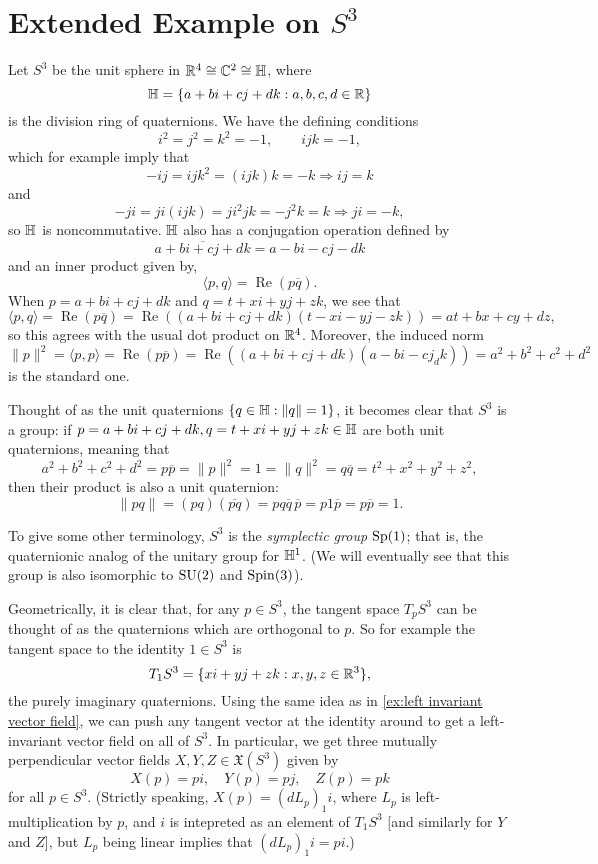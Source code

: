 
\section{Extended Example on $S^3$}
\label{sec:S^3 example}

Let $S^3$ be the unit sphere in $\mathbb{R}^4 \cong \mathbb{C}^2 \cong \mathbb{H}$, where 
\[
	\mathbb{H} = \{ a + bi + cj + dk : a,b,c,d\in \mathbb{R}\}
\]
is the division ring of quaternions. We have the defining conditions
\[
	i^2=j^2=k^2 = -1, \qquad ijk = -1,
\]
which for example imply that 
\[
	-ij = ijk^2 = (ijk)k = -k \Rightarrow ij=k
\]
and
\[
	-ji = ji(ijk) = ji^2jk = -j^2k = k \Rightarrow ji = -k,
\]
so $\mathbb{H}$ is noncommutative. $\mathbb{H}$ also has a conjugation operation defined by 
\[
	\overline{a+bi+cj+dk} = a-bi-cj-dk
\]
and an inner product given by,
\[
	\langle p,q \rangle = \operatorname{Re}(p\overline{q}).
\]
When $p = a+bi+cj+dk$ and $q = t + xi + yj + zk$, we see that
\[
	\langle p , q \rangle = \operatorname{Re}(p\overline{q}) = \operatorname{Re}((a+bi+cj+dk)(t-xi-yj-zk)) = at+bx+cy+dz,
\]
so this agrees with the usual dot product on $\mathbb{R}^4$. Moreover, the induced norm
\[
	\|p\|^2 = \langle p, p\rangle = \operatorname{Re}(p \overline{p}) = \operatorname{Re}((a+bi+cj+dk) (a-bi-cj_dk)) = a^2 + b^2 + c^2 + d^2
\]
is the standard one.

Thought of as the unit quaternions $\{q \in \mathbb{H} : \|q\| = 1\}$, it becomes clear that $S^3$ is a group: if $p = a+bi+cj+dk , q = t + xi + yj + zk \in \mathbb{H}$ are both unit quaternions, meaning that
\[
	a^2 + b^2 + c^2 + d^2 = p \overline{p} = \|p\|^2 = 1 = \|q\|^2 = q \overline{q} = t^2 + x^2 + y^2 + z^2,
\]
then their product is also a unit quaternion:
\[
	\|pq\| = (pq)(\overline{pq}) = p q \overline{q}\, \overline{p} = p 1 \overline{p} = p \overline{p} = 1.
\]

To give some other terminology, $S^3$ is the \emph{symplectic group} $\operatorname{Sp}(1)$; that is, the quaternionic analog of the unitary group for $\mathbb{H}^1$. (We will eventually see that this group is also isomorphic to $\operatorname{SU}(2)$ and $\operatorname{Spin}(3)$).

Geometrically, it is clear that, for any $p \in S^3$, the tangent space $T_pS^3$ can be thought of as the quaternions which are orthogonal to $p$. So for example the tangent space to the identity $1 \in S^3$ is
\[
	T_1 S^3 = \{xi + yj + zk : x,y,z \in \mathbb{R}^3\},
\]
the purely imaginary quaternions. Using the same idea as in \cref{ex:left invariant vector field}, we can push any tangent vector at the identity around to get a left-invariant vector field on all of $S^3$. In particular, we get three mutually perpendicular vector fields $X,Y,Z \in \mathfrak{X}(S^3)$ given by
\[
	X(p) = pi, \quad Y(p) = pj, \quad Z(p) = pk
\]
for all $p \in S^3$. (Strictly speaking, $X(p) = (d L_p)_1 i$, where $L_p$ is left-multiplication by $p$, and $i$ is intepreted as an element of $T_1S^3$ [and similarly for $Y$ and $Z$], but $L_p$ being linear implies that $(dL_p)_1 i = pi$.)

